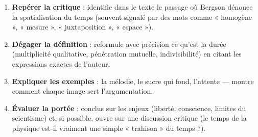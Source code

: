 \documentclass[11pt]{article}
\begin{document}
\begin{methode}
\begin{enumerate}
\item \textbf{Repérer la critique} : identifie dans le texte le passage où Bergson dénonce la spatialisation du temps (souvent signalé par des mots comme « homogène », « mesure », « juxtaposition », « espace »).
\item \textbf{Dégager la définition} : reformule avec précision ce qu'est la durée (multiplicité qualitative, pénétration mutuelle, indivisibilité) en citant les expressions exactes de l'auteur.
\item \textbf{Expliquer les exemples} : la mélodie, le sucre qui fond, l'attente — montre comment chaque image sert l'argumentation.
\item \textbf{Évaluer la portée} : conclus sur les enjeux (liberté, conscience, limites du scientisme) et, si possible, ouvre sur une discussion critique (le temps de la physique est-il vraiment une simple « trahison » du temps ?).
\end{enumerate}
\end{methode}
\end{document}
